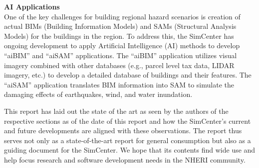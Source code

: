 \noindent\textbf{AI Applications} \\One of the key challenges for building regional hazard scenarios is creation of actual BIMs (Building Information Models) and SAMs (Structural Analysis Models) for the buildings in the region. To address this, the SimCenter has ongoing development to apply Artificial Intelligence (AI) methods to develop “aiBIM” and “aiSAM” applications. The “aiBIM” application utilizes visual imagery combined with other databases (e.g., parcel level tax data, LIDAR imagery, etc.) to develop a detailed database of buildings and their features. The “aiSAM” application translates BIM information into SAM to simulate the damaging effects of earthquakes, wind, and water inundation.
\newline

\noindent This report has laid out the state of the art as seen by the authors of the respective sections as of the date of this report and how the SimCenter's current and future developments are aligned with these observations. The report thus serves not only as a state-of-the-art report for general consumption but also as a guiding document for the SimCenter. We hope that its contents find wide use and help focus research and software development needs in the NHERI community.